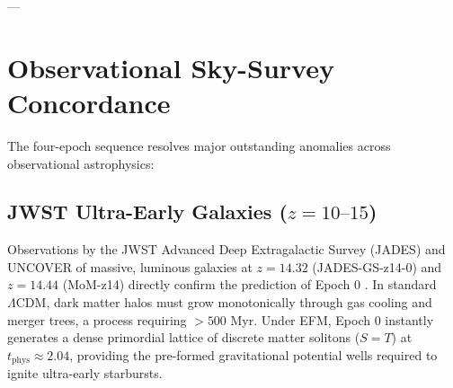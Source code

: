 \documentclass[11pt, twoside]{article}
\begin{document}
\begin{table}[H]
\centering
\caption{The Expanded Four-Epoch EFM Cosmic Chronology.}
\label{tab:four_epochs}
\end{table}

---

\section{Observational Sky-Survey Concordance}

The four-epoch sequence resolves major outstanding anomalies across observational astrophysics:

\subsection{JWST Ultra-Early Galaxies ($z = 10\text{--}15$)}
Observations by the JWST Advanced Deep Extragalactic Survey (JADES) and UNCOVER of massive, luminous galaxies at $z=14.32$ (JADES-GS-z14-0) and $z=14.44$ (MoM-z14) directly confirm the prediction of Epoch 0 \citep{carniani2024jades}. In standard $\Lambda\text{CDM}$, dark matter halos must grow monotonically through gas cooling and merger trees, a process requiring $>500$ Myr. Under EFM, Epoch 0 instantly generates a dense primordial lattice of discrete matter solitons ($S=T$) at $t_{\text{phys}} \approx 2.04$, providing the pre-formed gravitational potential wells required to ignite ultra-early starbursts.
\end{document}
